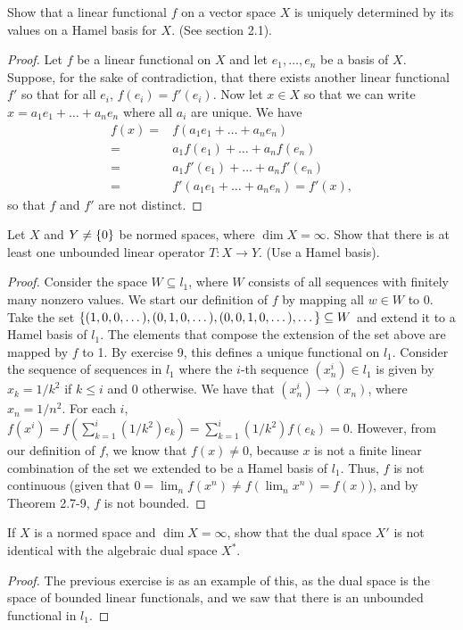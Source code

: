 \begin{exercise}{9}
Show that a linear functional $f$ on a vector space $X$ is uniquely determined by its values on a Hamel basis for $X$.
(See section 2.1).
\end{exercise}
\begin{proof}
Let $f$ be a linear functional on $X$ and let $e_1,\dots,e_n$ be a basis of $X$.
Suppose, for the sake of contradiction, that there exists another linear functional $f'$ so that for all $e_i$, $f(e_i)=f'(e_i)$.
Now let $x\in X$ so that we can write $x = a_1e_1+\dots+a_ne_n$ where all $a_i$ are unique.
We have 
\begin{align*}
f(x) 
=& f(a_1e_1+\dots+a_ne_n)\\
=& a_1f(e_1)+\dots+a_nf(e_n)\\
=& a_1f'(e_1)+\dots+a_nf'(e_n)\\
=& f'(a_1e_1+\dots+a_ne_n)
= f'(x),
\end{align*}
so that $f$ and $f'$ are not distinct.
\end{proof}

\begin{exercise}{10}
Let $X$ and $Y\neq\{0\}$ be normed spaces, where $\dim X=\infty $.
Show that there is at least one unbounded linear operator $T:X\to Y$.
(Use a Hamel basis).
\end{exercise}
\begin{proof}
Consider the space $W\subseteq l_1$, where $W$ consists of all sequences with finitely many nonzero values.
We start our definition of $f$ by mapping all $w\in W$ to 0.
Take the set $\{(1,0,0,\dots), (0,1,0,\dots), (0,0,1,0,\dots),\dots\}\subseteq W$ and extend it to a Hamel basis of $l_1$.
The elements that compose the extension of the set above are mapped by $f$ to 1.
By exercise 9, this defines a unique functional on $l_1$.
Consider the sequence of sequences in $l_1$ where the $i$-th sequence $(x_n^i)\in l_1$ is given by $x_k = 1/k^2$ if $k\leq i$ and 0 otherwise.
We have that $(x^i_n)\to (x_n)$, where $x_n=1/n^2$.
For each $i$, $f(x^i) = f(\sum^i_{k=1} (1/k^2)e_k) = \sum^i_{k=1} (1/k^2)f(e_k) = 0$.
However, from our definition of $f$, we know that $f(x)\neq 0$, because $x$ is not a finite linear combination of the set we extended to be a Hamel basis of $l_1$.
Thus, $f$ is not continuous (given that $0 = \lim_n f(x^n) \neq f(\lim_n x^n) = f(x)$), and by Theorem 2.7-9, $f$ is not bounded.
\end{proof}

\begin{exercise}{11}
If $X$ is a normed space and $\dim X=\infty$, show that the dual space $X'$ is not identical with the algebraic dual space $X^\ast$.
\end{exercise}
\begin{proof}
The previous exercise is as an example of this, as the dual space is the space of bounded linear functionals, and we saw that there is an unbounded functional in $l_1$.
\end{proof}

